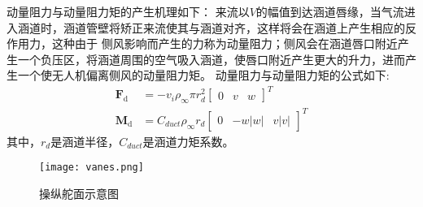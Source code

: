 动量阻力与动量阻力矩的产生机理如下：
来流以$V$的幅值到达涵道唇缘，当气流进入涵道时，涵道管壁将矫正来流使其与涵道对齐，这样将会在涵道上产生相应的反作用力，这种由于
侧风影响而产生的力称为动量阻力；侧风会在涵道唇口附近产生一个负压区，将涵道周围的空气吸入涵道，使唇口附近产生更大的升力，进而产生一个使无人机偏离侧风的动量阻力矩。
动量阻力与动量阻力矩的公式如下\cite{argyle2013vertical}:
\begin{align}
    \mathbf{F}_{\text {d}} & = -v_{i} \rho_{\infty} \pi r_{d}^{2}\left[\begin{array}{lll}
    0 & v & w
    \end{array}\right]^{T}\\
    \mathbf{M}_{\text {d}} & = C_{d u c t} \rho_{\infty} r_{d}\left[\begin{array}{lll}
    0 & -w|w| & v|v|
    \end{array}\right]^{T}
\end{align}
其中，$r_{d}$是涵道半径，$C_{duct}$是涵道力矩系数。
\begin{figure}[htbp]
    \centering
    \texttt{[image: vanes.png]}
    \caption{\label{fig:control_vanes}操纵舵面示意图}
\end{figure}
